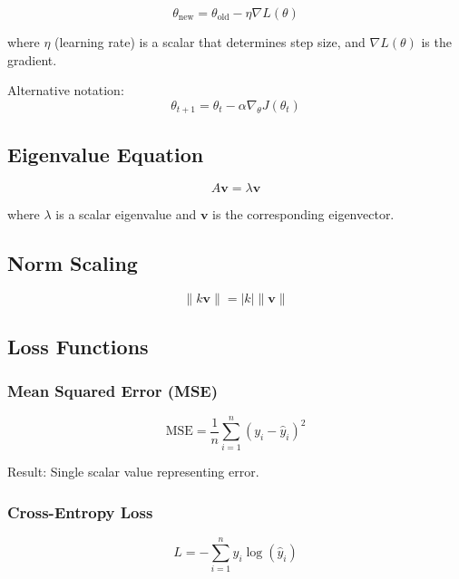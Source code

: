 \documentclass[11pt,a4paper]{article}
\begin{document}
\begin{equation}
    \theta_{\text{new}} = \theta_{\text{old}} - \eta \nabla L(\theta)
\end{equation}

where $\eta$ (learning rate) is a scalar that determines step size, and $\nabla L(\theta)$ is the gradient.

Alternative notation:
\begin{equation}
    \theta_{t+1} = \theta_t - \alpha \nabla_\theta J(\theta_t)
\end{equation}

\subsection{Eigenvalue Equation}

\begin{equation}
    A\mathbf{v} = \lambda \mathbf{v}
\end{equation}

where $\lambda$ is a scalar eigenvalue and $\mathbf{v}$ is the corresponding eigenvector.

\subsection{Norm Scaling}

\begin{equation}
    \|k\mathbf{v}\| = |k| \|\mathbf{v}\|
\end{equation}

\subsection{Loss Functions}

\subsubsection{Mean Squared Error (MSE)}

\begin{equation}
    \text{MSE} = \frac{1}{n} \sum_{i=1}^{n} (y_i - \hat{y}_i)^2
\end{equation}

Result: Single scalar value representing error.

\subsubsection{Cross-Entropy Loss}

\begin{equation}
    L = -\sum_{i=1}^{n} y_i \log(\hat{y}_i)
\end{equation}
\end{document}
